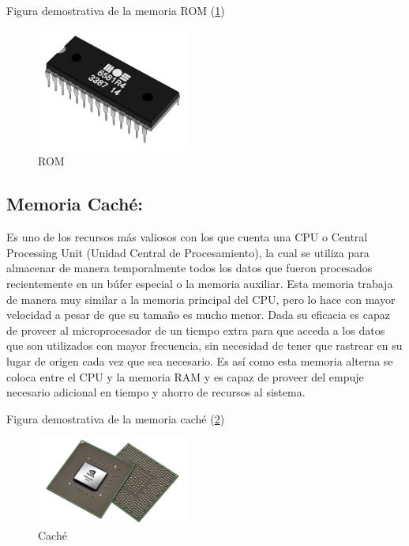 \documentclass{article}
\begin{document}
Figura demostrativa de la memoria ROM (\ref{fig_rom})\newline

\begin{figure}[h]
\includegraphics[width=5cm]{rom.png}
\centering
\caption{ROM}
\label{fig_rom}
\end{figure}

\subsection{Memoria Caché:}
Es uno de los recursos más valiosos con los que cuenta una CPU o Central Processing Unit (Unidad Central de Procesamiento), la cual se utiliza para almacenar de manera temporalmente todos los datos que fueron procesados recientemente en un búfer especial o la memoria auxiliar.\newline
Esta memoria trabaja de manera muy similar a la memoria principal del CPU, pero lo hace con mayor velocidad a pesar de que su tamaño es mucho menor. Dada su eficacia es capaz de proveer al microprocesador de un tiempo extra para que acceda a los datos que son utilizados con mayor frecuencia, sin necesidad de tener que rastrear en su lugar de origen cada vez que sea necesario.\newline
Es así como esta memoria alterna se coloca entre el CPU y la memoria RAM y es capaz de proveer del empuje necesario adicional en tiempo y ahorro de recursos al sistema.\newline

Figura demostrativa de la memoria caché (\ref{fig_cache})\newline

\begin{figure}[h]
\includegraphics[width=5cm]{cache.png}
\centering
\caption{Caché}
\label{fig_cache}
\end{figure}
\end{document}

